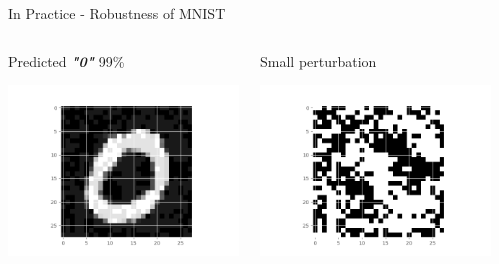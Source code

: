 \documentclass[t,compress,aspectratio=169]{beamer}
\begin{document}
\begin{frame}{In Practice - Robustness of MNIST}
    
   \begin{columns}
        \begin{column}{0.3\textwidth}
            \begin{center}
                        Predicted \textit{\textbf{"0"}} 99\%

             \includegraphics[width=\textwidth]{img/true.png}
             \end{center}
        \end{column}
        \begin{column}{0.3\textwidth}  %

            \begin{center}
                        Small perturbation

             \includegraphics[width=\textwidth]{img/eta.png}
             \end{center}
        \end{column}
          \begin{column}{0.32\textwidth}  %


\end{column}
\end{columns}
\end{frame}
\end{document}
